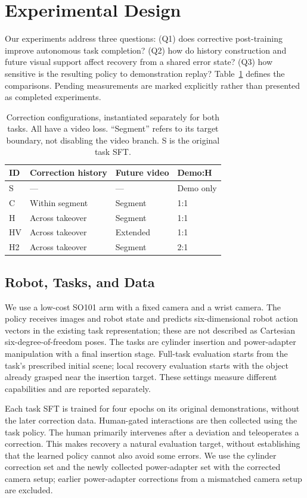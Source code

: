 \documentclass[letterpaper,10pt,conference]{ieeeconf}
\begin{document}
\section{Experimental Design}
Our experiments address three questions: (Q1) does corrective post-training improve autonomous task completion? (Q2) how do history construction and future visual support affect recovery from a shared error state? (Q3) how sensitive is the resulting policy to demonstration replay? Table~\ref{tab:configs} defines the comparisons. Pending measurements are marked explicitly rather than presented as completed experiments.

\begin{table}[t]
\centering\small
\caption{Correction configurations, instantiated separately for both tasks. All have a video loss. ``Segment'' refers to its target boundary, not disabling the video branch. S is the original task SFT.}
\label{tab:configs}
\begin{tabular}{llll}
\toprule
ID & Correction history & Future video & Demo:H \\
\midrule
S & --- & --- & Demo only \\
C & Within segment & Segment & 1:1 \\
H & Across takeover & Segment & 1:1 \\
HV & Across takeover & Extended & 1:1 \\
H2 & Across takeover & Segment & 2:1 \\
\bottomrule
\end{tabular}
\end{table}

\subsection{Robot, Tasks, and Data}
We use a low-cost SO101 arm with a fixed camera and a wrist camera. The policy receives images and robot state and predicts six-dimensional robot action vectors in the existing task representation; these are not described as Cartesian six-degree-of-freedom poses. The tasks are cylinder insertion and power-adapter manipulation with a final insertion stage. Full-task evaluation starts from the task's prescribed initial scene; local recovery evaluation starts with the object already grasped near the insertion target. These settings measure different capabilities and are reported separately.

Each task SFT is trained for four epochs on its original demonstrations, without the later correction data. Human-gated interactions are then collected using the task policy. The human primarily intervenes after a deviation and teleoperates a correction. This makes recovery a natural evaluation target, without establishing that the learned policy cannot also avoid some errors. We use the cylinder correction set and the newly collected power-adapter set with the corrected camera setup; earlier power-adapter corrections from a mismatched camera setup are excluded.
\end{document}
